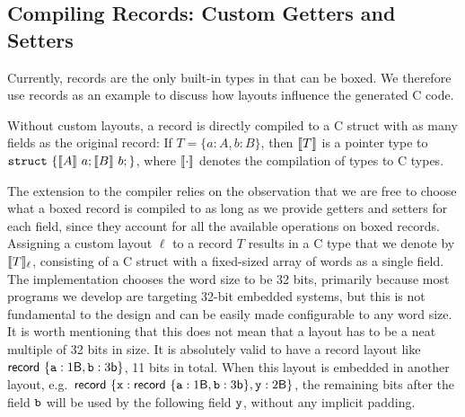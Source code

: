 \subsection{Compiling Records: Custom Getters and Setters}
\label{ssec:gsetters}

Currently, records are the only built-in types
in \cogent that can be boxed. We therefore use records as an example to
discuss how \dargent layouts influence the generated C code.

Without custom layouts, a \cogent record is directly compiled to a C struct
with as many fields as the original record: If
$T = \{a : A, b : B\}$, then
$\llbracket  T  \rrbracket$ is a pointer type to
$\texttt{struct}\ \{ \sem{ A }\ a; \sem{ B }\ b; \}$,
 where $\llbracket  \cdot  \rrbracket$ denotes the compilation of \cogent types to C types.


The \Dargent extension to the compiler relies on the observation that
we are free to choose
what a \cogent boxed record is compiled to
as long as we provide getters and setters for each field, since they
account for all the available \cogent operations on boxed records.
Assigning a custom layout
$\ell$ to a \cogent record $T$ results in a C type that we denote by
$\llbracket  T  \rrbracket_\ell$, consisting of a C struct with a fixed-sized array
of words as a single field.
The implementation chooses the word size to be 32 bits, primarily because
most \cogent programs we develop are targeting 32-bit embedded systems, but this is not fundamental to the design and can be easily made 
configurable to any word size.
It is worth mentioning that this does not mean that a layout has to be a neat
multiple of 32 bits in size. It is absolutely valid to have a record
layout like $\mathsf{record}\ \{  \texttt{a} : 1\mathsf{B}, \texttt{b} : 3\mathsf{b}  \}$, 
11 bits in total. When this layout is embedded in another layout,
e.g.\ $\mathsf{record}\ \{  \texttt{x} : \mathsf{record}\ \{  \texttt{a} : 1\mathsf{B}, \texttt{b} : 3\mathsf{b}  \},
               \texttt{y} : 2\mathsf{B}  \}$, 
the remaining bits after the field $\texttt{b}$ will be used by
the following field $\texttt{y}$, without any implicit padding.


